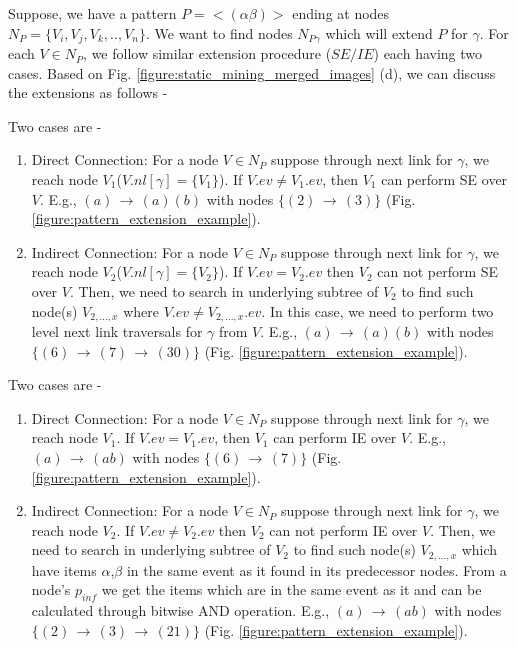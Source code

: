 Suppose, we have a pattern $P=< (\alpha\beta) >$ ending at nodes $N_{P}=\{V_{i},V_{j},V_{k},..,V_{n}\}$. We want to find nodes $N_{P\gamma}$ which will extend $P$ for $\gamma$. For each $V \in N_{P}$, we follow similar extension procedure ($SE/IE$) each having two cases. Based on Fig. \ref{figure:static_mining_merged_images} (d), we can discuss the extensions as follows - 

\begin{definition}
Two cases are - 
\begin{enumerate}
    \item Direct Connection: For a node $V \in N_{P}$ suppose through next link for $\gamma$, we reach node $V_{1}$($V.nl[\gamma]=\{V_{1}\}$). If $V.ev \neq V_{1}.ev$, then $V_{1}$ can perform SE over $V$. E.g., $(a)\,\to\,(a)(b)$ with nodes $\{(2)\,\to\,(3)\}$ (Fig. \ref{figure:pattern_extension_example}). 
    \item Indirect Connection:  For a node $V \in N_{P}$ suppose through next link for $\gamma$, we reach node $V_{2}$($V.nl[\gamma]=\{V_{2}\}$). If $V.ev = V_{2}.ev$ then $V_{2}$ can not perform SE over $V$. Then, we need to search in underlying subtree of $V_{2}$ to find such node(s) $V_{2,...,x}$ where $V.ev \neq V_{2,...,x}.ev$. In this case, we need to perform two level next link traversals for $\gamma$ from $V$. E.g., $(a)\,\to\,(a)(b)$ with nodes $\{(6)\,\to\,(7)\,\to\,(30)\}$ (Fig. \ref{figure:pattern_extension_example}). 
\end{enumerate}
\end{definition}


\begin{definition}
Two cases are - 
\begin{enumerate}
    \item Direct Connection:  For a node $V \in N_{P}$ suppose through next link for $\gamma$, we reach node $V_{1}$. If $V.ev = V_{1}.ev$, then $V_{1}$ can perform IE over $V$. E.g., $(a)\,\to\,(ab)$ with nodes $\{(6)\,\to\,(7)\}$ (Fig. \ref{figure:pattern_extension_example}). 
    \item Indirect Connection:  For a node $V \in N_{P}$ suppose through next link for $\gamma$, we reach node $V_{2}$.  If $V.ev \neq V_{2}.ev$ then $V_{2}$ can not perform IE over $V$. Then, we need to search in underlying subtree of $V_{2}$ to find such node(s) $V_{2,...,x}$ which have items $\alpha$,$\beta$ in the same event as it found in its predecessor nodes. From a node's $p_{inf}$ we get the items which are in the same event as it and can be calculated through bitwise AND operation. E.g., $(a)\,\to\,(ab)$ with nodes $\{(2)\,\to\,(3)\,\to\,(21)\}$ (Fig. \ref{figure:pattern_extension_example}).    
\end{enumerate}
\end{definition}

